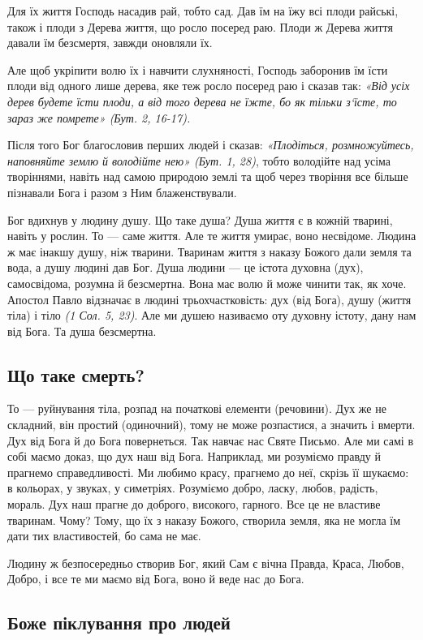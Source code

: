 \documentclass[main.tex]{subfiles}
\begin{document}
Для їх життя Господь насадив рай, тобто сад. Дав їм на їжу всі плоди райські, також і плоди з Дерева життя, що росло посеред раю. Плоди ж Дерева життя давали їм безсмертя, завжди оновляли їх.

Але щоб укріпити волю їх і навчити слухняності, Господь заборонив їм їсти плоди від одного лише дерева, яке теж росло посеред раю і сказав так: \emph{{\color{red} «Від усіх дерев будете їсти плоди, а від того дерева не їжте, бо як тільки з`їсте, то зараз же помрете»} (Бут. 2, 16-17).}

Після того Бог благословив перших людей і сказав: \emph{{\color{red} «Плодіться, розмножуйтесь, наповняйте землю й володійте нею»} (Бут. 1, 28)}, тобто володійте над усіма творіннями, навіть над самою природою землі та щоб через творіння все більше пізнавали Бога і разом з Ним блаженствували.

Бог вдихнув у людину душу. Що таке душа? Душа життя є в кожній тварині, навіть у рослин. То — саме життя. Але те життя умирає, воно несвідоме. Людина ж має інакшу душу, ніж тварини. Тваринам життя з наказу Божого дали земля та вода, а душу людині дав Бог. Душа людини — це істота духовна (дух), самосвідома, розумна й безсмертна. Вона має волю й може чинити так, як хоче. Апостол Павло відзначає в людині трьохчастковість: дух (від Бога), душу (життя тіла) і тіло \emph{(1 Сол. 5, 23)}. Але ми душею називаємо оту духовну істоту, дану нам від Бога. Та душа безсмертна.

\subsection{Що таке смерть?}

То — руйнування тіла, розпад на початкові елементи (речовини). Дух же не складний, він простий (одиночний), тому не може розпастися, а значить і вмерти. Дух від Бога й до Бога повернеться. Так навчає нас Святе Письмо. Але ми самі в собі маємо доказ, що дух наш від Бога. Наприклад, ми розуміємо правду й прагнемо справедливості. Ми любимо красу, прагнемо до неї, скрізь її шукаємо: в кольорах, у звуках, у симетріях. Розуміємо добро, ласку, любов, радість, мораль. Дух наш прагне до доброго, високого, гарного. Все це не властиве тваринам. Чому? Тому, що їх з наказу Божого, створила земля, яка не могла їм дати тих властивостей, бо сама не має.

Людину ж безпосередньо створив Бог, який Сам є вічна Правда, Краса, Любов, Добро, і все те ми маємо від Бога, воно й веде нас до Бога.

\subsection{Боже піклування про людей}
\end{document}
